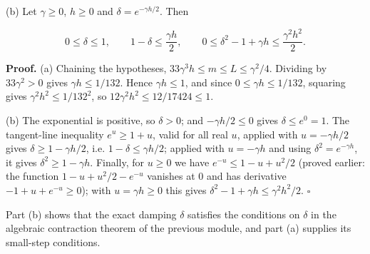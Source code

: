 \documentclass[11pt,a4paper]{article}
\begin{document}
(b) Let \(\gamma\ge0\), \(h\ge0\) and \(\delta=e^{-\gamma h/2}\). Then


\[0\le\delta\le1,\qquad1-\delta\le\frac{\gamma h}2,\qquad0\le\delta^2-1+\gamma h\le\frac{\gamma^2h^2}2 .\]


\textbf{Proof.} (a) Chaining the hypotheses, \(33\gamma^3h\le m\le L\le\gamma^2/4\). Dividing by \(33\gamma^2>0\) gives \(\gamma h\le1/132\). Hence \(\gamma h\le1\), and since \(0\le\gamma h\le1/132\), squaring gives \(\gamma^2h^2\le1/132^2\), so \(12\gamma^2h^2\le12/17424\le1\).




(b) The exponential is positive, so \(\delta>0\); and \(-\gamma h/2\le0\) gives \(\delta\le e^0=1\). The tangent-line inequality \(e^u\ge1+u\), valid for all real \(u\), applied with \(u=-\gamma h/2\) gives \(\delta\ge1-\gamma h/2\), i.e. \(1-\delta\le\gamma h/2\); applied with \(u=-\gamma h\) and using \(\delta^2=e^{-\gamma h}\), it gives \(\delta^2\ge1-\gamma h\). Finally, for \(u\ge0\) we have \(e^{-u}\le1-u+u^2/2\) (proved earlier: the function \(1-u+u^2/2-e^{-u}\) vanishes at \(0\) and has derivative \(-1+u+e^{-u}\ge0\)); with \(u=\gamma h\ge0\) this gives \(\delta^2-1+\gamma h\le\gamma^2h^2/2\). \(\square\)




Part (b) shows that the exact damping \(\delta\) satisfies the conditions on \(\delta\) in the algebraic contraction theorem of the previous module, and part (a) supplies its small-step conditions.
\end{document}
